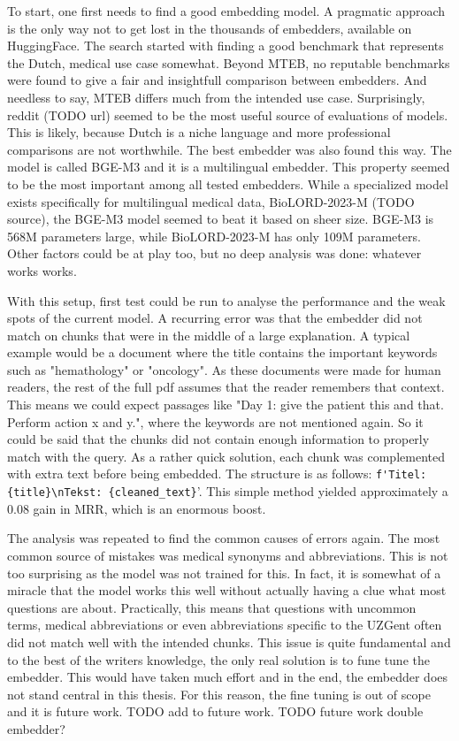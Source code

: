 To start, one first needs to find a good embedding model. A pragmatic approach is the only way not to get lost in the thousands of embedders, available on HuggingFace. The search started with finding a good benchmark that represents the Dutch, medical use case somewhat. Beyond MTEB, no reputable benchmarks were found to give a fair and insightfull comparison between embedders. And needless to say, MTEB differs much from the intended use case. Surprisingly, reddit (TODO url) seemed to be the most useful source of evaluations of models. This is likely, because Dutch is a niche language and more professional comparisons are not worthwhile. The best embedder was also found this way. The model is called BGE-M3 and it is a multilingual embedder. This property seemed to be the most important among all tested embedders. While a specialized model exists specifically for multilingual medical data, BioLORD-2023-M (TODO source), the BGE-M3 model seemed to beat it based on sheer size. BGE-M3 is 568M parameters large, while BioLORD-2023-M has only 109M parameters. Other factors could be at play too, but no deep analysis was done: whatever works works.

With this setup, first test could be run to analyse the performance and the weak spots of the current model. A recurring error was that the embedder did not match on chunks that were in the middle of a large explanation. A typical example would be a document where the title contains the important keywords such as "hemathology" or "oncology". As these documents were made for human readers, the rest of the full pdf assumes that the reader remembers that context. This means we could expect passages like "Day 1: give the patient this and that. Perform action x and y.", where the keywords are not mentioned again. So it could be said that the chunks did not contain enough information to properly match with the query. As a rather quick solution, each chunk was complemented with extra text before being embedded. The structure is as follows: \verb|f'Titel: {title}\nTekst: {cleaned_text}|'. This simple method yielded approximately a 0.08 gain in MRR, which is an enormous boost.

The analysis was repeated to find the common causes of errors again. The most common source of mistakes was medical synonyms and abbreviations. This is not too surprising as the model was not trained for this. In fact, it is somewhat of a miracle that the model works this well without actually having a clue what most questions are about. Practically, this means that questions with uncommon terms, medical abbreviations or even abbreviations specific to the UZGent often did not match well with the intended chunks. This issue is quite fundamental and to the best of the writers knowledge, the only real solution is to fune tune the embedder. This would have taken much effort and in the end, the embedder does not stand central in this thesis. For this reason, the fine tuning is out of scope and it is future work. TODO add to future work. TODO future work double embedder?

